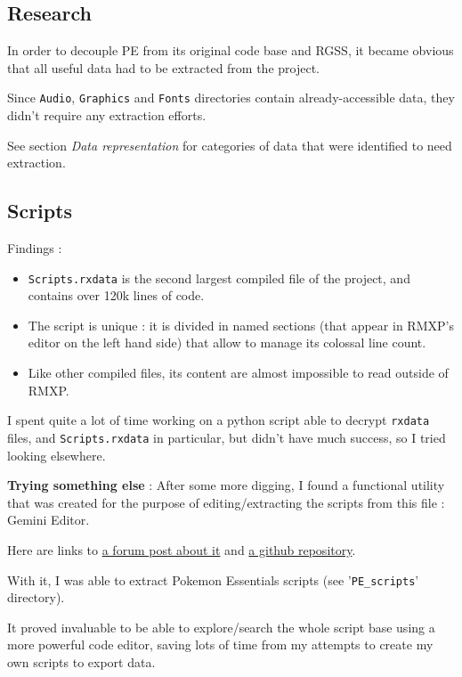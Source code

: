 \documentclass[11pt]{article}
\begin{document}
\subsection{Research}

In order to decouple PE from its original code base and RGSS, it became obvious that all useful data had to be extracted from the project.

Since \verb|Audio|, \verb|Graphics| and \verb|Fonts| directories contain already-accessible data, they didn't require any extraction efforts.

See section \textit{Data representation} for categories of data that were identified to need extraction.


\subsection{Scripts}

Findings :
\begin{itemize}
	\item \verb|Scripts.rxdata| is the second largest compiled file of the project, and contains over 120k lines of code.
	
	\item The script is unique : it is divided in named sections (that appear in RMXP's editor on the left hand side) that allow to manage its colossal line count.
	
	\item Like other compiled files, its content are almost impossible to read outside of RMXP.
\end{itemize}

I spent quite a lot of time working on a python script able to decrypt \verb|rxdata| files, and \verb|Scripts.rxdata| in particular, but didn't have much success, so I tried looking elsewhere.

\textbf{Trying something else} : After some more digging, I found a functional utility that was created for the purpose of editing/extracting the scripts from this file : Gemini Editor.

Here are links to \href{https://forum.chaos-project.com/index.php/topic,10420.0.html}{a forum post about it} and \href{https://github.com/terabin/Gemini}{a github repository}.

With it, I was able to extract Pokemon Essentials scripts (see '\verb|PE_scripts|' directory).

It proved invaluable to be able to explore/search the whole script base using a more powerful code editor, saving lots of time from my attempts to create my own scripts to export data.
\end{document}
